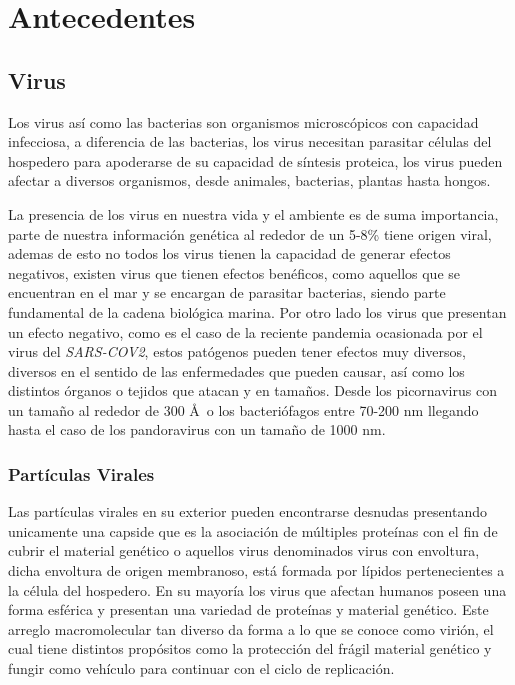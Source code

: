 \chapter{Antecedentes}
\label{ch1}

\section{Virus}

Los virus así como las bacterias son organismos microscópicos con capacidad infecciosa, a diferencia de las bacterias, los virus necesitan parasitar células del hospedero para apoderarse de su capacidad de síntesis proteica, los virus pueden afectar a diversos organismos, desde animales, bacterias, plantas hasta hongos. \cite{Racaniello2020}

La presencia de los virus en nuestra vida y el ambiente es de suma importancia, parte de nuestra información genética al rededor de un 5-8\% tiene origen viral, ademas de esto no todos los virus tienen la capacidad de generar efectos negativos, existen virus que tienen efectos benéficos, como aquellos que se encuentran en el mar y se encargan de parasitar bacterias, siendo parte fundamental de la cadena biológica marina. Por otro lado los virus que presentan un efecto negativo, como es el caso de la reciente pandemia ocasionada por el virus del \textit{SARS-COV2}, estos patógenos  pueden tener efectos muy diversos, diversos en el sentido de las enfermedades que pueden causar, así como los distintos órganos o tejidos que atacan y en tamaños. Desde los picornavirus con un tamaño al rededor de 300 \AA \, o los bacteriófagos entre 70-200 nm llegando hasta el caso de los pandoravirus con un tamaño de 1000 nm. \cite{Racaniello2020,Rossmann2013,Van2022}
\subsection{Partículas Virales}
Las partículas virales en su exterior pueden encontrarse desnudas presentando unicamente una capside que es la asociación de múltiples proteínas con el fin de cubrir el material genético o aquellos virus denominados virus con envoltura, dicha envoltura de origen membranoso, está formada por lípidos pertenecientes a la célula del hospedero. En su mayoría los virus que afectan humanos poseen una forma esférica y presentan una variedad de proteínas y material genético. Este arreglo macromolecular tan diverso da forma a lo que se conoce como virión, el cual tiene distintos propósitos como la protección del frágil material genético y fungir como vehículo para continuar con el ciclo de replicación. \cite{Racaniello2020,Van2022}

